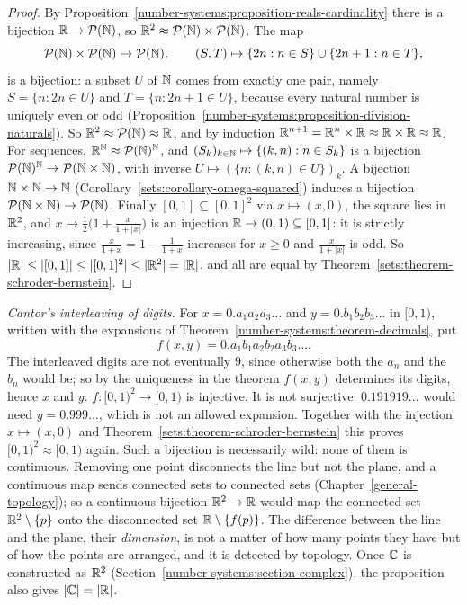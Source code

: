 \begin{proof}
By Proposition~\ref{number-systems:proposition-reals-cardinality} there is a bijection $\mathbb{R} \to \mathcal{P}(\mathbb{N})$, so $\mathbb{R}^2 \approx \mathcal{P}(\mathbb{N}) \times \mathcal{P}(\mathbb{N})$. The map
\[
\mathcal{P}(\mathbb{N}) \times \mathcal{P}(\mathbb{N}) \to \mathcal{P}(\mathbb{N}), \qquad (S, T) \mapsto \{2n : n \in S\} \cup \{2n + 1 : n \in T\},
\]
is a bijection: a subset $U$ of $\mathbb{N}$ comes from exactly one pair, namely $S = \{n : 2n \in U\}$ and $T = \{n : 2n + 1 \in U\}$, because every natural number is uniquely even or odd
(Proposition~\ref{number-systems:proposition-division-naturals}). So $\mathbb{R}^2 \approx \mathcal{P}(\mathbb{N}) \approx \mathbb{R}$, and by induction $\mathbb{R}^{n+1} = \mathbb{R}^n \times \mathbb{R} \approx \mathbb{R} \times \mathbb{R} \approx \mathbb{R}$. For sequences,
$\mathbb{R}^{\mathbb{N}} \approx \mathcal{P}(\mathbb{N})^{\mathbb{N}}$, and $(S_k)_{k \in \mathbb{N}} \mapsto \{(k, n) : n \in S_k\}$ is a bijection $\mathcal{P}(\mathbb{N})^{\mathbb{N}} \to \mathcal{P}(\mathbb{N} \times \mathbb{N})$, with inverse $U \mapsto (\{n : (k, n) \in U\})_k$. A
bijection $\mathbb{N} \times \mathbb{N} \to \mathbb{N}$ (Corollary~\ref{sets:corollary-omega-squared}) induces a bijection $\mathcal{P}(\mathbb{N} \times \mathbb{N}) \to \mathcal{P}(\mathbb{N})$. Finally $[0, 1] \subseteq [0, 1]^2$ via $x \mapsto (x, 0)$, the square lies in $\mathbb{R}^2$, and
$x \mapsto \frac12\bigl(1 + \frac{x}{1 + |x|}\bigr)$ is an injection $\mathbb{R} \to (0, 1) \subseteq [0, 1]$: it is strictly increasing, since $\frac{x}{1 + x} = 1 - \frac1{1 + x}$ increases for $x \geq 0$ and
$\frac{x}{1 + |x|}$ is odd. So $|\mathbb{R}| \leq |[0, 1]| \leq |[0, 1]^2| \leq |\mathbb{R}^2| = |\mathbb{R}|$, and all are equal by Theorem~\ref{sets:theorem-schroder-bernstein}.
\end{proof}

\begin{remark}\label{number-systems:remark-interleaving}
\emph{Cantor's interleaving of digits.} For $x = 0.a_1a_2a_3\ldots$ and $y = 0.b_1b_2b_3\ldots$ in $[0, 1)$, written with the expansions of Theorem~\ref{number-systems:theorem-decimals}, put
\[
f(x, y) = 0.a_1b_1a_2b_2a_3b_3\ldots .
\]
The interleaved digits are not eventually $9$, since otherwise both the $a_n$ and the $b_n$ would be; so by the uniqueness in the theorem $f(x, y)$ determines its digits, hence $x$ and $y$: $f \colon [0, 1)^2 \to [0, 1)$ is
injective. It is not surjective: $0.191919\ldots$ would need $y = 0.999\ldots$, which is not an allowed expansion. Together with the injection $x \mapsto (x, 0)$ and
Theorem~\ref{sets:theorem-schroder-bernstein} this proves $[0, 1)^2 \approx [0, 1)$ again. Such a bijection is necessarily wild: none of them is continuous. Removing one point disconnects the line but not the plane, and a continuous map sends connected
sets to connected sets (Chapter~\ref{general-topology}); so a continuous bijection $\mathbb{R}^2 \to \mathbb{R}$ would map the connected set $\mathbb{R}^2 \setminus \{p\}$ onto the disconnected set $\mathbb{R} \setminus \{f(p)\}$. The difference between
the line and the plane, their \emph{dimension}, is not a matter of how many points they have but of how the points are arranged, and it is detected by topology. Once $\mathbb{C}$ is constructed as $\mathbb{R}^2$
(Section~\ref{number-systems:section-complex}), the proposition also gives $|\mathbb{C}| = |\mathbb{R}|$.
\end{remark}

